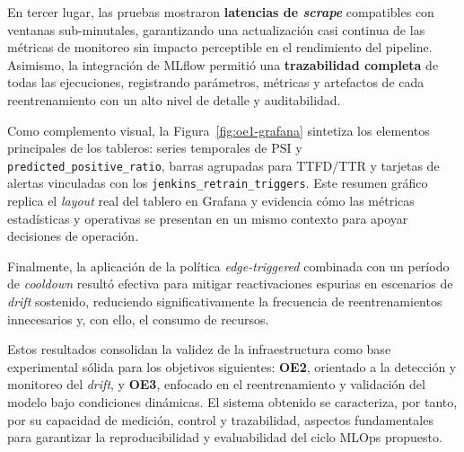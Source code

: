 En tercer lugar, las pruebas mostraron \textbf{latencias de \textit{scrape}} compatibles con ventanas sub-minutales, garantizando una actualización casi continua de las métricas de monitoreo sin impacto perceptible en el rendimiento del pipeline.  
Asimismo, la integración de MLflow permitió una \textbf{trazabilidad completa} de todas las ejecuciones, registrando parámetros, métricas y artefactos de cada reentrenamiento con un alto nivel de detalle y auditabilidad.  

Como complemento visual, la Figura~\ref{fig:oe1-grafana} sintetiza los elementos principales de los tableros: series temporales de $\mathrm{PSI}$ y \texttt{predicted\_positive\_ratio}, barras agrupadas para TTFD/TTR y tarjetas de alertas vinculadas con los \texttt{jenkins\_retrain\_triggers}. Este resumen gráfico replica el \textit{layout} real del tablero en Grafana y evidencia cómo las métricas estadísticas y operativas se presentan en un mismo contexto para apoyar decisiones de operación.

Finalmente, la aplicación de la política \textit{edge-triggered} combinada con un período de \textit{cooldown} resultó efectiva para mitigar reactivaciones espurias en escenarios de \textit{drift} sostenido, reduciendo significativamente la frecuencia de reentrenamientos innecesarios y, con ello, el consumo de recursos.  

Estos resultados consolidan la validez de la infraestructura como base experimental sólida para los objetivos siguientes: \textbf{OE2}, orientado a la detección y monitoreo del \textit{drift}, y \textbf{OE3}, enfocado en el reentrenamiento y validación del modelo bajo condiciones dinámicas.  
El sistema obtenido se caracteriza, por tanto, por su capacidad de medición, control y trazabilidad, aspectos fundamentales para garantizar la reproducibilidad y evaluabilidad del ciclo MLOps propuesto.

